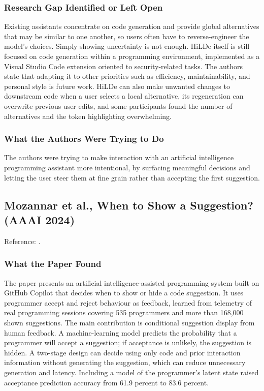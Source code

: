 \documentclass[11pt,a4paper]{report}
\begin{document}
\subsubsection{Research Gap Identified or Left Open}

Existing assistants concentrate on code generation and provide global
alternatives that may be similar to one another, so users often have to
reverse-engineer the model's choices. Simply showing uncertainty is not
enough. HiLDe itself is still focused on code generation within a
programming environment, implemented as a Visual Studio Code extension
oriented to security-related tasks. The authors state that adapting it
to other priorities such as efficiency, maintainability, and personal
style is future work. HiLDe can also make unwanted changes to
downstream code when a user selects a local alternative, its
regeneration can overwrite previous user edits, and some participants
found the number of alternatives and the token highlighting
overwhelming.

\subsubsection{What the Authors Were Trying to Do}

The authors were trying to make interaction with an artificial
intelligence programming assistant more intentional, by surfacing
meaningful decisions and letting the user steer them at fine grain
rather than accepting the first suggestion.

\subsection{Mozannar et al., When to Show a Suggestion? (AAAI 2024)}

\noindent Reference: \autocite{mozannar2024whento}.

\subsubsection{What the Paper Found}

The paper presents an artificial intelligence-assisted programming
system built on GitHub Copilot that decides when to show or hide a code
suggestion. It uses programmer accept and reject behaviour as feedback,
learned from telemetry of real programming sessions covering 535
programmers and more than 168,000 shown suggestions. The main
contribution is conditional suggestion display from human feedback. A
machine-learning model predicts the probability that a programmer will
accept a suggestion; if acceptance is unlikely, the suggestion is
hidden. A two-stage design can decide using only code and prior
interaction information without generating the suggestion, which can
reduce unnecessary generation and latency. Including a model of the
programmer's latent state raised acceptance prediction accuracy from
61.9 percent to 83.6 percent.
\end{document}
